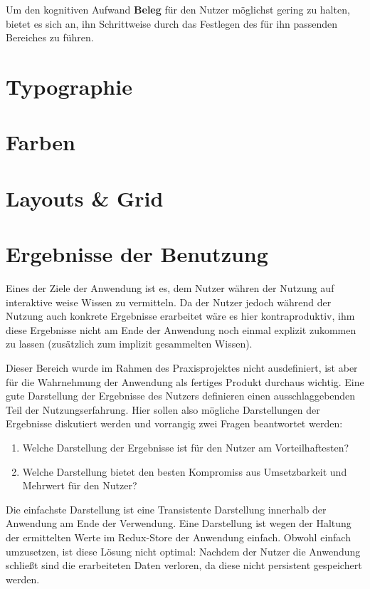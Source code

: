 Um den kognitiven Aufwand \textbf{Beleg} für den Nutzer möglichst gering zu halten, bietet es sich an, ihn Schrittweise durch das Festlegen des für ihn passenden Bereiches zu führen.

\section{Typographie}

\section{Farben}

\section{Layouts \& Grid}


\section{Ergebnisse der Benutzung}
Eines der Ziele der Anwendung ist es, dem Nutzer währen der Nutzung auf interaktive weise Wissen zu vermitteln. Da der Nutzer jedoch während der Nutzung auch konkrete Ergebnisse erarbeitet wäre es hier kontraproduktiv, ihm diese Ergebnisse nicht am Ende der Anwendung noch einmal explizit zukommen zu lassen (zusätzlich zum implizit gesammelten Wissen).

Dieser Bereich wurde im Rahmen des Praxisprojektes nicht ausdefiniert, ist aber für die Wahrnehmung der Anwendung als fertiges Produkt durchaus wichtig. Eine gute Darstellung der Ergebnisse des Nutzers definieren einen ausschlaggebenden Teil der Nutzungserfahrung.
Hier sollen also mögliche Darstellungen der Ergebnisse diskutiert werden und vorrangig zwei Fragen beantwortet werden:
\begin{enumerate}
  \item Welche Darstellung der Ergebnisse ist für den Nutzer am Vorteilhaftesten?
  \item Welche Darstellung bietet den besten Kompromiss aus Umsetzbarkeit und Mehrwert für den Nutzer?
\end{enumerate}

Die einfachste Darstellung ist eine Transistente Darstellung innerhalb der Anwendung am Ende der Verwendung. Eine Darstellung ist wegen der Haltung der ermittelten Werte im Redux-Store der Anwendung einfach. Obwohl einfach umzusetzen, ist diese Lösung nicht optimal: Nachdem der Nutzer die Anwendung schließt sind die erarbeiteten Daten verloren, da diese nicht persistent gespeichert werden.

